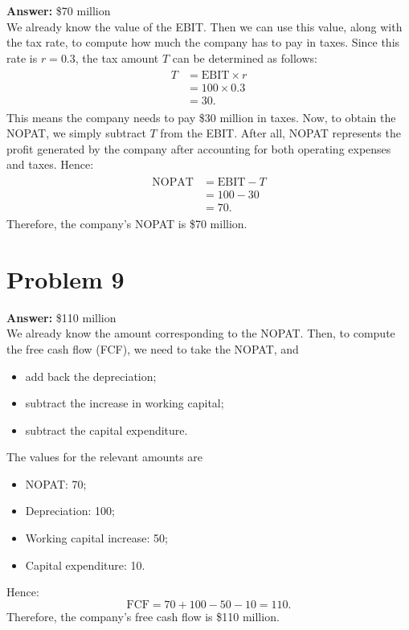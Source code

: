 \documentclass[11pt]{article}
\begin{document}
\textbf{Answer:} \$70 million\\

We already know the value of the EBIT. Then we can use this value, along with
the tax rate, to compute how much the company has to pay in taxes. Since this
rate is \(r=0.3\), the tax amount \(T\) can be determined as follows:
\begin{align}
  \begin{split}
    T&=\mathrm{EBIT}\times r\\
    &=100\times 0.3\\
    &=30.
  \end{split}
\end{align}
This means the company needs to pay \$30 million in taxes. Now, to obtain the
NOPAT, we simply subtract \(T\) from the EBIT. After all, NOPAT represents the
profit generated by the company after accounting for both operating expenses and
taxes. Hence:
\begin{align}
  \begin{split}
    \mathrm{NOPAT}&=\mathrm{EBIT}-T\\
    &=100-30\\
    &=70.
  \end{split}
\end{align}
Therefore, the company's NOPAT is \$70 million.
\section*{Problem 9}
\label{sec:org64fdb0b}

\textbf{Answer:} \$110 million\\

We already know the amount corresponding to the NOPAT. Then, to compute the free
cash flow (FCF), we need to take the NOPAT, and
\begin{itemize}
\item add back the depreciation;
\item subtract the increase in working capital;
\item subtract the capital expenditure.
\end{itemize}
The values for the relevant amounts are
\begin{itemize}
\item NOPAT: 70;
\item Depreciation: 100;
\item Working capital increase: 50;
\item Capital expenditure: 10.
\end{itemize}
Hence:
\begin{equation}
\mathrm{FCF}=70+100-50-10=110.
\end{equation}
Therefore, the company's free cash flow is \$110 million.
\end{document}

